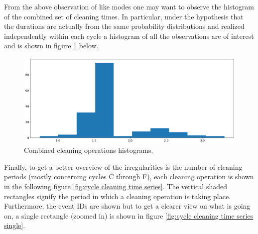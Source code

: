\documentclass[../Thesis.tex]{subfiles}
\begin{document}
From the above observation of like modes one may want to observe the histogram of the combined set of cleaning times. In particular, under the hypothesis that the durations are actually from the same probability distributions and realized independently within each cycle a histogram of all the observations are of interest and is shown in figure \ref{fig:cycle cleaning histograms combined} below.


\begin{figure}[H]
    \centering
    \includegraphics[width=0.8\linewidth]{figures/Multiple cycles data/Cleaning batches histograms combined.png}
    \caption{Combined cleaning operations histograms.}
    \label{fig:cycle cleaning histograms combined}
\end{figure}


Finally, to get a better overview of the irregularities is the number of cleaning periods (mostly concerning cycles C through F), each cleaning operation is shown in the following figure \ref{fig:cycle cleaning time series}. The vertical shaded rectangles signify the period in which a cleaning operation is taking place. Furthermore, the event IDs are shown but to get a clearer view on what is going on, a single rectangle (zoomed in) is shown in figure \ref{fig:cycle cleaning time series single}.
\end{document}
